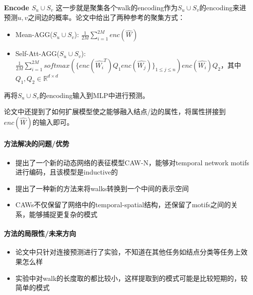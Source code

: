 \par{\textbf{Encode $S_u \cup S_v$}}
这一步就是聚集各个walk的encoding作为$S_u \cup S_v$的encoding来进预测$u, v$之间边的概率。论文中给出了两种参考的聚集方式：
\begin{itemize}
	\item Mean-AGG($S_u \cup S_v$): $\frac{1}{2M} \sum_{i=1}^{2M} enc(\hat{W})$
	\item Self-Att-AGG($S_u \cup S_v$): $\frac{1}{2M} \sum_{i=1}^{2M} softmax(\{enc(\hat{W_i}^T) Q_1 enc(\hat{W_j})\}_{1 \le j \le n}) enc(\hat{W_i}) Q_2$，其中$Q_1, Q_2 \in \mathbb{R}^{d \times d}$
\end{itemize}
再将$S_u \cup S_v$的encoding输入到MLP中进行预测。

论文中还提到了如何扩展模型使之能够融入结点/边的属性，将属性拼接到$enc(\hat{W})$的输入即可。


\paragraph{方法解决的问题/优势}

\begin{itemize}

	\item 提出了一个新的动态网络的表征模型CAW-N，能够对temporal network motifs进行编码，且该模型是inductive的
	\item 提出了一种新的方法来将walks转换到一个中间的表示空间
	\item CAWs不仅保留了网络中的temporal-spatial结构，还保留了motifs之间的关系，能够捕捉更复杂的模式

\end{itemize}



\paragraph{方法的局限性/未来方向}

\begin{itemize}

	\item 论文中只针对连接预测进行了实验，不知道在其他任务如结点分类等任务上效果怎么样
	\item 实验中对walk的长度取的都比较小，这样提取到的模式可能是比较短期的，较简单的模式

\end{itemize}



